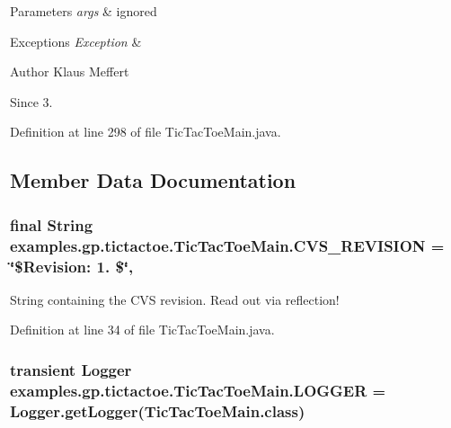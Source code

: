 \begin{DoxyParams}{Parameters}
{\em args} & ignored \\
\hline
\end{DoxyParams}

\begin{DoxyExceptions}{Exceptions}
{\em Exception} & \\
\hline
\end{DoxyExceptions}
\begin{DoxyAuthor}{Author}
Klaus Meffert 
\end{DoxyAuthor}
\begin{DoxySince}{Since}
3. 
\end{DoxySince}


Definition at line 298 of file Tic\-Tac\-Toe\-Main.\-java.



\subsection{Member Data Documentation}
\hypertarget{classexamples_1_1gp_1_1tictactoe_1_1_tic_tac_toe_main_abf6d02b9c15c52e94b836062bf20db37}{
\subsubsection[{C\-V\-S\-\_\-\-R\-E\-V\-I\-S\-I\-O\-N}]{\setlength{\rightskip}{0pt plus 5cm}final String examples.\-gp.\-tictactoe.\-Tic\-Tac\-Toe\-Main.\-C\-V\-S\-\_\-\-R\-E\-V\-I\-S\-I\-O\-N = \char`\"{}\$Revision\-: 1. \$\char`\"{}\hspace{0.3cm}{\ttfamily [static]}, {\ttfamily [private]}}}\label{classexamples_1_1gp_1_1tictactoe_1_1_tic_tac_toe_main_abf6d02b9c15c52e94b836062bf20db37}
String containing the C\-V\-S revision. Read out via reflection! 

Definition at line 34 of file Tic\-Tac\-Toe\-Main.\-java.

\hypertarget{classexamples_1_1gp_1_1tictactoe_1_1_tic_tac_toe_main_a6132c3447a4c68cc1f32594dc92d15fc}{
\subsubsection[{L\-O\-G\-G\-E\-R}]{\setlength{\rightskip}{0pt plus 5cm}transient Logger examples.\-gp.\-tictactoe.\-Tic\-Tac\-Toe\-Main.\-L\-O\-G\-G\-E\-R = Logger.\-get\-Logger(Tic\-Tac\-Toe\-Main.\-class)\hspace{0.3cm}{\ttfamily [static]}}}\label{classexamples_1_1gp_1_1tictactoe_1_1_tic_tac_toe_main_a6132c3447a4c68cc1f32594dc92d15fc}


